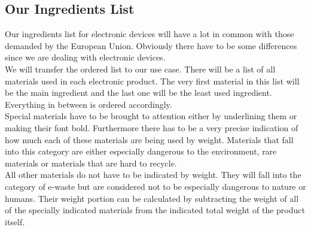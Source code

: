 \subsection{Our Ingredients List}

Our ingredients list for electronic devices will have a lot in common with those demanded by the European Union. Obviously there have to be some differences since we are dealing with electronic devices. \\

We will transfer the ordered list to our use case. There will be a list of all materials used in each electronic product. The very first material in this list will be the main ingredient and the last one will be the least used ingredient. Everything in between is ordered accordingly. \\
Special materials have to be brought to attention either by underlining them or making their font bold. Furthermore there has to be a very precise indication of how much each of these materials are being used by weight. Materials that fall into this category are either especially dangerous to the environment, rare materials or materials that are hard to recycle. \\

All other materials do not have to be indicated by weight. They will fall into the category of e-waste but are considered not to be especially dangerous to nature or humans. Their weight portion can be calculated by subtracting the weight of all of the specially indicated materials from the indicated total weight of the product itself. 

